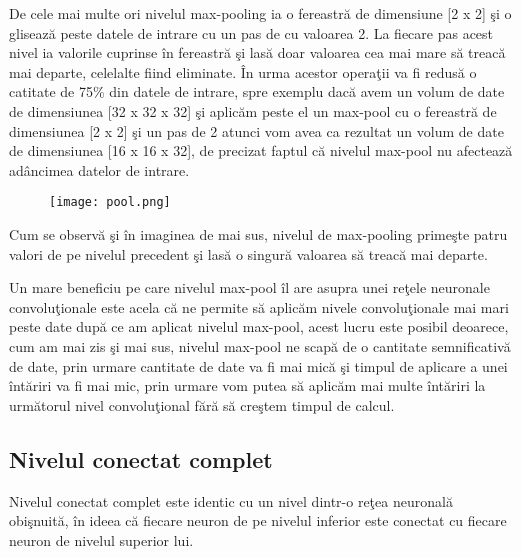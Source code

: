 \par

De cele mai multe ori nivelul max-pooling ia o fereastr\u{a} de dimensiune [2 x 2] \c{s}i o gliseaz\u{a} peste datele de intrare cu un pas de cu valoarea 2. La fiecare pas acest nivel ia valorile cuprinse \^{i}n fereastr\u{a} \c{s}i las\u{a} doar valoarea cea mai mare s\u{a} treac\u{a} mai departe, celelalte fiind eliminate. \^{I}n urma acestor opera\c{t}ii va fi redus\u{a} o catitate de 75\% din datele de intrare, spre exemplu dac\u{a} avem un volum de date de dimensiunea [32 x 32 x 32] \c{s}i aplic\u{a}m peste el un max-pool cu o fereastr\u{a} de dimensiunea [2 x 2] \c{s}i un pas de 2 atunci vom avea ca rezultat un volum de date de dimensiunea [16 x 16 x 32], de precizat faptul c\u{a} nivelul max-pool nu afecteaz\u{a} ad\^{a}ncimea datelor de intrare.

\begin{figure}[h!]
  \centering
  \texttt{[image: pool.png]}
\end{figure}

Cum se observ\u{a} \c{s}i \^{i}n imaginea de mai sus, nivelul de max-pooling prime\c{s}te patru valori de pe nivelul precedent \c{s}i las\u{a} o singur\u{a} valoarea s\u{a} treac\u{a} mai departe.

Un mare beneficiu pe care nivelul max-pool \^{i}l are asupra unei re\c{t}ele neuronale convolu\c{t}ionale este acela c\u{a} ne permite s\u{a} aplic\u{a}m nivele convolu\c{t}ionale mai mari peste date dup\u{a} ce am aplicat nivelul max-pool, acest lucru este posibil deoarece, cum am mai zis \c{s}i mai sus, nivelul max-pool ne scap\u{a} de o cantitate semnificativ\u{a} de date, prin urmare cantitate de date va fi mai mic\u{a} \c{s}i timpul de aplicare a unei \^{i}nt\u{a}riri va fi mai mic, prin urmare vom putea s\u{a} aplic\u{a}m mai multe \^{i}nt\u{a}riri la urm\u{a}torul nivel convolu\c{t}ional f\u{a}r\u{a} s\u{a} cre\c{s}tem timpul de calcul.

\subsection{Nivelul conectat complet}

Nivelul conectat complet este identic cu un nivel dintr-o re\c{t}ea neuronal\u{a} obi\c{s}nuit\u{a}, \^{i}n ideea c\u{a} fiecare neuron de pe nivelul inferior este conectat cu fiecare neuron de nivelul superior lui.

\par

